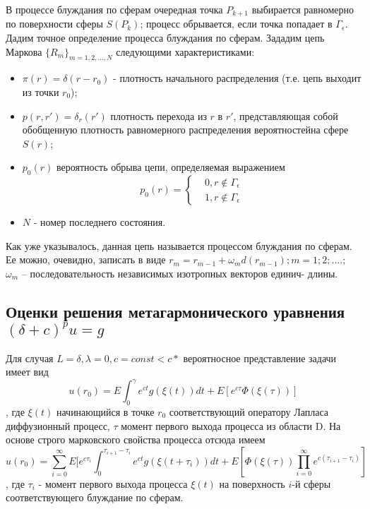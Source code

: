 В процессе блуждания по сферам очередная точка $P_{k+1}$ выбирается равномерно по поверхности сферы $S(P_{k})$; процесс обрывается, если точка попадает в $ \Gamma_{\epsilon }$. Дадим точное определение процесса блуждания по сферам. Зададим цепь Маркова $\{R_{m}\}_{m=1,2,...,N} $ следующими характеристиками:\begin{itemize}
	\item $\pi (r) = \delta(r-r_{0})$ - плотность начального распределения (т.е. цепь выходит из точки $r_0$);
	\item $p(r,r') = \delta_{r}(r') $ плотность перехода из $r$ в $r'$, представляющая собой обобщенную плотность равномерного распределения вероятностейна сфере $S(r)$;
	\item $p_{0}(r)$ вероятность обрыва цепи, определяемая выражением \[ p_{0}(r)= 
	\left\{
\begin{aligned}
& 0, r \notin \Gamma_{\epsilon}\\ & 1, r\notin \Gamma_{\epsilon}
\end{aligned}
 \right. \]
\item{}$N$ - номер последнего состояния.
\end{itemize}
Как уже указывалось, данная цепь называется процессом блуждания по сферам. Ее можно, очевидно, записать в виде $r_{m} = r_{m-1} + \omega_{m}d(r_{m-1}); m = 1; 2;....;$
$\omega_{m}$ -- последовательность независимых изотропных векторов единич-
 длины.
\subsection{Оценки решения метагармонического уравнения$(\delta+c)^{p}u=g $}
Для случая $L=\delta, \lambda=0,c = const<c*$ вероятносное представление задачи имеет вид \[ u(r_{0})=E\int_{0}^{\gamma}e^{ct}g(\xi(t))dt+E[e^{c\tau}\Phi(\xi(\tau))]\],{}
где $\xi(t)$  начинающийся в точке $r_{0}$ соответствующий оператору Лапласа диффузионный процесс, $\tau $  момент первого выхода процесса из области D. На основе строго марковского свойства процесса отсюда имеем 
\[ u(r_{0})=\sum_{i=0}^{\infty} E [e^{c\tau_{i}} \int_{0}^{\tau_{i+1}-\tau_{i}}e^{ct}g(\xi(t+\tau_{i}))dt+E[\Phi(\xi(\tau)){}
\prod_{i=0}^{\infty}e^{c(\tau_{i+1}-\tau_{i})}]\],{}
где $ \tau_{i}$ - момент первого выхода процесса $\xi(t)$ на поверхность $i$-й сферы соответствующего блуждание по сферам.
